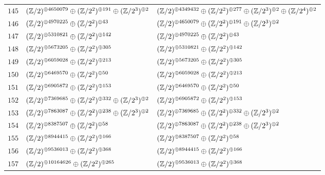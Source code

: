 \begin{supertabular}{|c|p{5.5cm}|p{5.5cm}|}
$145$%
&$(\mathbb{Z}/2)^{\oplus4650079}\oplus(\mathbb{Z}/2^{2})^{\oplus191}\oplus(\mathbb{Z}/2^{3})^{\oplus2}$%
&$(\mathbb{Z}/2)^{\oplus4349432}\oplus(\mathbb{Z}/2^{2})^{\oplus277}\oplus(\mathbb{Z}/2^{3})^{\oplus2}\oplus(\mathbb{Z}/2^{4})^{\oplus2}$\\

$146$%
&$(\mathbb{Z}/2)^{\oplus4970225}\oplus(\mathbb{Z}/2^{2})^{\oplus43}$%
&$(\mathbb{Z}/2)^{\oplus4650079}\oplus(\mathbb{Z}/2^{2})^{\oplus191}\oplus(\mathbb{Z}/2^{3})^{\oplus2}$\\

$147$%
&$(\mathbb{Z}/2)^{\oplus5310821}\oplus(\mathbb{Z}/2^{2})^{\oplus142}$%
&$(\mathbb{Z}/2)^{\oplus4970225}\oplus(\mathbb{Z}/2^{2})^{\oplus43}$\\

$148$%
&$(\mathbb{Z}/2)^{\oplus5673205}\oplus(\mathbb{Z}/2^{2})^{\oplus305}$%
&$(\mathbb{Z}/2)^{\oplus5310821}\oplus(\mathbb{Z}/2^{2})^{\oplus142}$\\

$149$%
&$(\mathbb{Z}/2)^{\oplus6059028}\oplus(\mathbb{Z}/2^{2})^{\oplus213}$%
&$(\mathbb{Z}/2)^{\oplus5673205}\oplus(\mathbb{Z}/2^{2})^{\oplus305}$\\

$150$%
&$(\mathbb{Z}/2)^{\oplus6469570}\oplus(\mathbb{Z}/2^{2})^{\oplus50}$%
&$(\mathbb{Z}/2)^{\oplus6059028}\oplus(\mathbb{Z}/2^{2})^{\oplus213}$\\

$151$%
&$(\mathbb{Z}/2)^{\oplus6905872}\oplus(\mathbb{Z}/2^{2})^{\oplus153}$%
&$(\mathbb{Z}/2)^{\oplus6469570}\oplus(\mathbb{Z}/2^{2})^{\oplus50}$\\

$152$%
&$(\mathbb{Z}/2)^{\oplus7369685}\oplus(\mathbb{Z}/2^{2})^{\oplus332}\oplus(\mathbb{Z}/2^{3})^{\oplus2}$%
&$(\mathbb{Z}/2)^{\oplus6905872}\oplus(\mathbb{Z}/2^{2})^{\oplus153}$\\

$153$%
&$(\mathbb{Z}/2)^{\oplus7863087}\oplus(\mathbb{Z}/2^{2})^{\oplus238}\oplus(\mathbb{Z}/2^{3})^{\oplus2}$%
&$(\mathbb{Z}/2)^{\oplus7369685}\oplus(\mathbb{Z}/2^{2})^{\oplus332}\oplus(\mathbb{Z}/2^{3})^{\oplus2}$\\

$154$%
&$(\mathbb{Z}/2)^{\oplus8387507}\oplus(\mathbb{Z}/2^{2})^{\oplus58}$%
&$(\mathbb{Z}/2)^{\oplus7863087}\oplus(\mathbb{Z}/2^{2})^{\oplus238}\oplus(\mathbb{Z}/2^{3})^{\oplus2}$\\

$155$%
&$(\mathbb{Z}/2)^{\oplus8944415}\oplus(\mathbb{Z}/2^{2})^{\oplus166}$%
&$(\mathbb{Z}/2)^{\oplus8387507}\oplus(\mathbb{Z}/2^{2})^{\oplus58}$\\

$156$%
&$(\mathbb{Z}/2)^{\oplus9536013}\oplus(\mathbb{Z}/2^{2})^{\oplus368}$%
&$(\mathbb{Z}/2)^{\oplus8944415}\oplus(\mathbb{Z}/2^{2})^{\oplus166}$\\

$157$%
&$(\mathbb{Z}/2)^{\oplus10164626}\oplus(\mathbb{Z}/2^{2})^{\oplus265}$%
&$(\mathbb{Z}/2)^{\oplus9536013}\oplus(\mathbb{Z}/2^{2})^{\oplus368}$\\


\end{supertabular}
